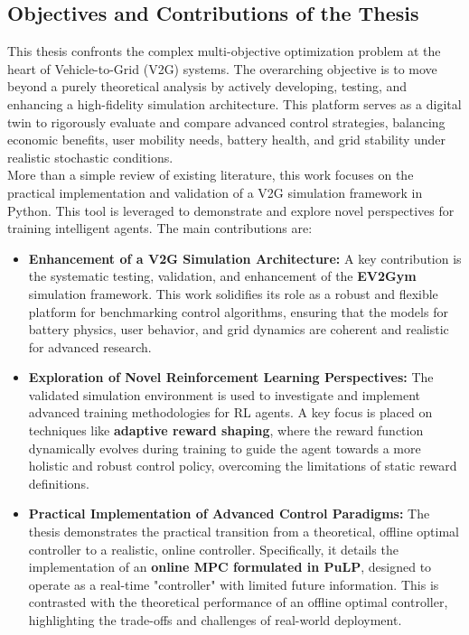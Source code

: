 \subsection{Objectives and Contributions of the Thesis}

This thesis confronts the complex multi-objective optimization problem at the heart of Vehicle-to-Grid (V2G) systems. The overarching objective is to move beyond a purely theoretical analysis by actively developing, testing, and enhancing a high-fidelity simulation architecture. This platform serves as a digital twin to rigorously evaluate and compare advanced control strategies, balancing economic benefits, user mobility needs, battery health, and grid stability under realistic stochastic conditions.
\\
More than a simple review of existing literature, this work focuses on the practical implementation and validation of a V2G simulation framework in Python. This tool is leveraged to demonstrate and explore novel perspectives for training intelligent agents. The main contributions are:

\begin{itemize}
    \item \textbf{Enhancement of a V2G Simulation Architecture:} A key contribution is the systematic testing, validation, and enhancement of the \textbf{EV2Gym} simulation framework. This work solidifies its role as a robust and flexible platform for benchmarking control algorithms, ensuring that the models for battery physics, user behavior, and grid dynamics are coherent and realistic for advanced research.

    \item \textbf{Exploration of Novel Reinforcement Learning Perspectives:} The validated simulation environment is used to investigate and implement advanced training methodologies for RL agents. A key focus is placed on techniques like \textbf{adaptive reward shaping}, where the reward function dynamically evolves during training to guide the agent towards a more holistic and robust control policy, overcoming the limitations of static reward definitions.

    \item \textbf{Practical Implementation of Advanced Control Paradigms:} The thesis demonstrates the practical transition from a theoretical, offline optimal controller to a realistic, online controller. Specifically, it details the implementation of an \textbf{online MPC formulated in PuLP}, designed to operate as a real-time "controller" with limited future information. This is contrasted with the theoretical performance of an offline optimal controller, highlighting the trade-offs and challenges of real-world deployment.
\end{itemize}

